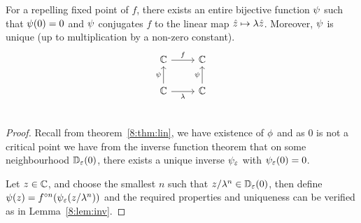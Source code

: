\documentclass[../main.tex]{subfiles}
\begin{document}
\begin{thm}
    \label{8:thm:replinglob}
    For a repelling fixed point of $f$, there exists an entire bijective function $\psi$ such that $\psi (0)=0$ and $\psi$ conjugates $f$ to the linear map $\hat{z} \mapsto \lambda\hat{z}$. Moreover, $\psi$ is unique (up to multiplication by a non-zero constant).
    \begin{equation*}
        \begin{tikzcd}
            \C \ar[r, "f"] & \C \\
            \C \ar[u, "\linV"]
            \ar[r, "\lambda"'] & 
            \C \ar[u, "\linV"] \\
        \end{tikzcd}
    \end{equation*}
\end{thm} 

\begin{proof}
    Recall from theorem~\ref{8:thm:lin}, we have existence of $\phi$  and as 0 is not a critical point we have from the inverse function theorem that on some neighbourhood $\mathbb{D}_{\varepsilon}(0)$, there exists a unique inverse $\psi_{\varepsilon}$ with $\psi_{\varepsilon}(0)=0$. 
    
    Let $z\in\mathbb{C}$, and choose the smallest $n$  such that $z/{\lambda ^{n}}\in\mathbb{D}_{\varepsilon}(0)$, then define $\psi(z)=f^{\circ n}(\psi_{\varepsilon} (z/{\lambda ^{n}}))$ and the required properties and uniqueness can be verified as in Lemma~\ref{8:lem:inv}.
\end{proof}
\end{document}
